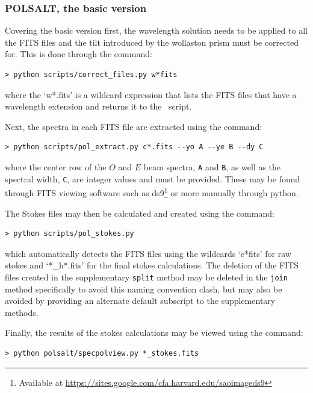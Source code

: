 \subsubsection{POLSALT, the basic version}

Covering the basic version first, the wavelength solution needs to be applied to all the \gls{FITS} files and the tilt introduced by the wollaston prism must be corrected for. This is done through the command:

\begin{verbatim}> python scripts/correct_files.py w*fits\end{verbatim}

\noindent where the `w*.fits' is a wildcard expression that lists the \gls{FITS} files that have a wavelength extension and returns it to the \polsalt\ script.
\prgph

Next, the spectra in each \gls{FITS} file are extracted using the command:

\begin{verbatim}> python scripts/pol_extract.py c*.fits --yo A --ye B --dy C\end{verbatim}

\noindent where the center row of the $O$ and $E$ beam spectra, \texttt{A} and \texttt{B}, as well as the spectral width, \texttt{C}, are integer values and must be provided. These may be found through \gls{FITS} viewing software such as ds9\footnote{Available at \protect\url{https://sites.google.com/cfa.harvard.edu/saoimageds9}} or more manually through python.
\prgph

The Stokes files may then be calculated and created using the command:

\begin{verbatim}> python scripts/pol_stokes.py\end{verbatim}

\noindent which automatically detects the \gls{FITS} files using the wildcards `e*fits' for raw stokes and `*\_h*.fits' for the final stokes calculations. The deletion of the \gls{FITS} files created in the supplementary \texttt{split} method may be deleted in the \texttt{join} method specifically to avoid this naming convention clash, but may also be avoided by providing an alternate default subscript to the supplementary methods.
\prgph

Finally, the results of the stokes calculations may be viewed using the command:

\begin{verbatim}> python polsalt/specpolview.py *_stokes.fits\end{verbatim}

